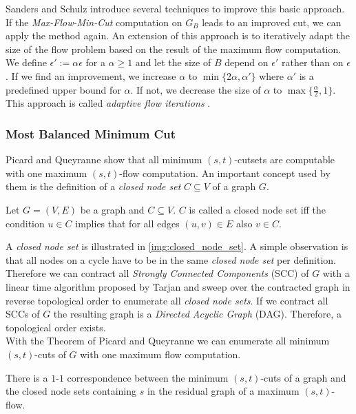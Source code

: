 Sanders and Schulz \cite{sanders2011engineering} introduce several techniques to improve
this basic approach. If the \emph{Max-Flow-Min-Cut} computation on $G_B$ leads to an
improved cut, we can apply the method again. 
An extension of this approach is to iteratively adapt the
size of the flow problem based on the result of the maximum flow computation.
We define $\epsilon' := \alpha\epsilon$ for a $\alpha \ge 1$ and let the size of $B$ depend
on $\epsilon'$ rather than on $\epsilon$. If we find an improvement, we
increase $\alpha$ to $\min\{2\alpha, \alpha'\}$ where $\alpha'$ is a predefined upper bound
for $\alpha$. If not, we decrease the size of $\alpha$ to 
$\max\{\frac{\alpha}{2},1\}$. This approach is called
\emph{adaptive flow iterations} \cite{sanders2011engineering}.

\subsubsection{Most Balanced Minimum Cut}
\label{sec:related_mbmc}

Picard and Queyranne \cite{picard1980structure} show that all minimum $(s,t)$-cutsets 
are computable with one maximum $(s,t)$-flow computation.
An important concept used by them is the definition
of a \emph{closed node set} $C \subseteq V$ of a graph $G$.

\begin{definition}
Let $G = (V,E)$ be a graph and $C \subseteq V$. $C$ is called a closed node set iff the 
condition $u \in C$ implies that for all edges $(u,v) \in E$ also $v \in C$.
\end{definition}

A \emph{closed node set} is illustrated in \autoref{img:closed_node_set}. A simple observation
is that all nodes on a cycle have to be in the same \emph{closed node set} per definition. Therefore
we can contract all \emph{Strongly Connected Components} (SCC) of $G$ with a linear time algorithm
proposed by Tarjan \cite{tarjan1972depth} and sweep over the contracted graph in reverse
topological order to enumerate all \emph{closed node sets}. If
we contract all SCCs of $G$ the resulting graph is a \emph{Directed Acyclic Graph} (DAG). Therefore, 
a topological order exists. \\
With the Theorem of Picard and Queyranne \cite{picard1980structure} we can enumerate
all minimum $(s,t)$-cuts of $G$ with one maximum flow computation.

\begin{theorem}
\label{theorem:mbmc}
There is a $1$-$1$ correspondence between the minimum $(s,t)$-cuts of a graph and the closed node
sets containing $s$ in the residual graph of a maximum $(s,t)$-flow.
\end{theorem}

